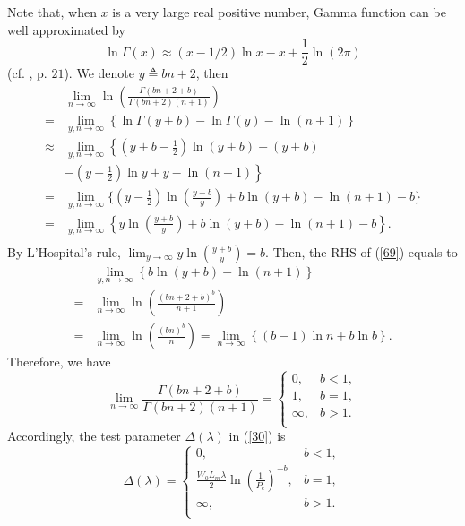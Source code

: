 \documentclass[journal]{IEEEtran}
\begin{document}
Note that, when $x$ is a very large real positive number, Gamma function can be well approximated by
\begin{equation}
\ln\Gamma(x) \approx (x-1/2) \ln x - x + \frac{1}{2}\ln(2\pi)
\end{equation}
(cf. \cite{1953:Bateman}, p. $21$). We denote $y\triangleq bn+2$, then
\begin{equation}
\label{69}
\begin{aligned}
&\lim_{n\rightarrow \infty}\ln\left(\frac{\Gamma(bn+2+b)}{\Gamma(bn+2)(n+1)}\right)\\
=& \lim_{y,n\rightarrow \infty}\left\{\ln\Gamma(y+b) - \ln\Gamma(y)- \ln(n+1)\right\}\\
\approx& \lim_{y,n\rightarrow \infty}\left\{\left(y+b-\frac{1}{2}\right)\ln(y+b) - (y+b) \right.\\
&\left.- \left(y-\frac{1}{2}\right)\ln y + y -\ln(n+1)\right\}\\
=& \lim_{y,n\rightarrow \infty}\biggr\{\left(y-\frac{1}{2}\right)\ln\left(\frac{y+b}{y}\right) + b\ln (y+b) - \ln(n+1) -b\biggr\}\\
=& \lim_{y,n\rightarrow \infty}\left\{y\ln\left(\frac{y+b}{y}\right) + b\ln (y+b) - \ln(n+1) -b\right\}.\\
\end{aligned}
\end{equation}
By L'Hospital's rule, $\lim_{y\rightarrow \infty}y\ln\left(\frac{y+b}{y}\right)=b$. Then, the RHS of (\ref{69}) equals to
\begin{equation}
\begin{aligned}
&\lim_{y,n\rightarrow \infty}\left\{b\ln (y+b) - \ln(n+1)\right\}\\
=& \lim_{n\rightarrow \infty} \ln\left(\frac{(bn+2+b)^b}{n+1}\right)\\
=& \lim_{n\rightarrow \infty} \ln\left(\frac{(bn)^b}{n}\right)= \lim_{n\rightarrow \infty} \left\{ (b-1)\ln n +b\ln b\right\}.
\end{aligned}
\end{equation}
Therefore, we have
\begin{equation}
\label{28}
\lim_{n\rightarrow \infty}\frac{\Gamma(bn+2+b)}{\Gamma(bn+2)(n+1)}=
\begin{cases}
0, &b<1,\\
1,&b=1,\\
\infty, &b>1.\\
\end{cases}
\end{equation}
Accordingly, the test parameter $\Delta(\lambda)$ in (\ref{30}) is
\begin{equation}
\Delta(\lambda)=
\begin{cases}
0, &b<1,\\
\frac{W_0L_m\lambda}{2}\ln\left(\frac{1}{P_c}\right)^{-b}, &b=1,\\
\infty, &b>1.\\
\end{cases}
\end{equation}
\end{document}
